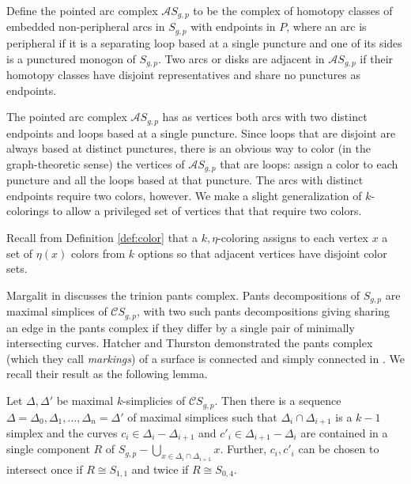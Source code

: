 \begin{definition}
  Define the pointed arc complex
  $\mathcal A S_{g,p}$
  to be the complex of homotopy classes of embedded
  non-peripheral arcs in $S_{g,p}$ with endpoints in $P$,
  where an arc is peripheral if
  it is a separating loop based at a single puncture
  and one of its sides is a punctured monogon of $S_{g,p}$.
  Two arcs or disks are adjacent in
  $\mathcal A S_{g,p}$ if their homotopy classes
  have disjoint representatives and share no punctures as endpoints.
  \label{def:ptarc}
\end{definition}

\begin{remark}
  The pointed arc complex $\mathcal A S_{g,p}$ has as vertices
  both arcs with two distinct
  endpoints and loops based at a single puncture.
  Since loops that are disjoint are always
  based at distinct punctures,
  there is an obvious way to color (in the graph-theoretic sense)
  the vertices of
  $\mathcal A S_{g,p}$ that are loops:
  assign a color to each puncture and all the loops based at that puncture.
  The arcs with distinct endpoints
  require two colors, however.
  We make a slight generalization of
  $k$-colorings to allow a privileged set of vertices that
  that require two colors.

  Recall from Definition \ref{def:color}
  that a $k,\eta$-coloring
  assigns to each vertex $x$ a set of $\eta(x)$ colors from $k$ options
  so that adjacent vertices have disjoint color sets.
\end{remark}


\begin{remark}
Margalit in \cite{MR2040283} discusses the
trinion pants complex.
Pants decompositions of $S_{g,p}$ are maximal simplices of
$\mathcal C S_{g,p}$,
with two such pants decompositions giving sharing
an edge in the pants complex if they differ
by a single pair of minimally intersecting curves.
Hatcher and Thurston
demonstrated the
pants complex (which they call \emph{markings}) of a surface
is connected and simply connected
in \cite{MR579573}.
We recall their result as the following lemma.
\end{remark}

\begin{lemma}
  \label{lem:maxsimppath}
  Let $\Delta,\Delta'$ be maximal $k$-simplicies of $\mathcal C S_{g,p}$.
  Then there is a sequence $\Delta = \Delta_0, \Delta_1, \ldots, \Delta_n=\Delta'$
  of maximal simplices such that
  $\Delta_i \cap \Delta_{i+1}$ is a $k-1$ simplex
  and the curves $c_i \in \Delta_i - \Delta_{i+1}$
  and $c'_i \in \Delta_{i+1} - \Delta_i$
  are contained in a single component $R$ of
  $S_{g,p} - \bigcup_{x \in \Delta_i \cap \Delta_{i+1}} x$.
  Further,
  $c_i,c'_i$ can be chosen to intersect once if $R \cong S_{1,1}$
  and twice if $R \cong S_{0,4}$.
  \label{lemma:pantspath}
\end{lemma}

